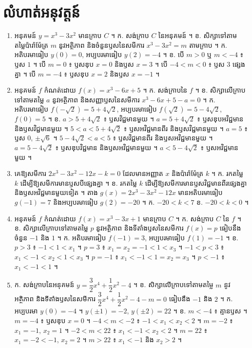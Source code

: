 \section*{លំហាត់អនុវត្តន៍}
\begin{enumerate}[1]
  \item អនុគមន៍ $y = x^3 - 3x^2$ មានក្រាប $C$ ។ \quad ក. សង់ក្រាប $C$ នៃអនុគមន៍ ។ \quad ខ. សិក្សាទៅតាមតម្លៃប៉ារ៉ាម៉ែត្រ $m$ នូវអត្ថិភាព និងចំនួនឫសនៃសមីការ $x^3 - 3x^2 = m$ តាមក្រាប ។
  \ans
  ក. អតិបរមាធៀប $y(0) = 0$, អប្បបរមាធៀប $y(2) = -4$ ។ ខ. បើ $m > 0$ ឬ $m < -4$ ៖ ឫស $1$ ។ បើ $m = 0$ ៖ ឫសឌុប $x = 0$ និងឫស $x = 3$ ។ បើ $-4 < m < 0$ ៖ ឫស $3$ ផ្សេងគ្នា ។ បើ $m = -4$ ៖ ឫសឌុប $x = 2$ និងឫស $x = -1$ ។
  \item អនុគមន៍ $f$ កំណត់ដោយ $f(x) = x^3 - 6x + 5$ ។ \quad ក. សង់ក្រាបនៃ $f$ ។ \quad ខ. សិក្សាលើក្រាបទៅតាមតម្លៃ $a$ នូវអត្ថិភាព និងសញ្ញាឫសនៃសមីការ $x^3 - 6x + 5 - a = 0$ ។
  \ans
  ក. អតិបរមាធៀប $f(-\sqrt{2}) = 5 + 4\sqrt{2}$, អប្បបរមាធៀប $f(\sqrt{2}) = 5 - 4\sqrt{2}$, $f(0) = 5$ ។ ខ. $a > 5 + 4\sqrt{2}$ ៖ ឫសវិជ្ជមានមួយ ។ $a = 5 + 4\sqrt{2}$ ៖ ឫសឌុបអវិជ្ជមាន និងឫសវិជ្ជមានមួយ ។ $5 < a < 5 + 4\sqrt{2}$ ៖ ឫសអវិជ្ជមានពីរ និងឫសវិជ្ជមានមួយ ។ $a = 5$ ៖ ឫស $0$, $\pm\sqrt{6}$ ។ $5 - 4\sqrt{2} < a < 5$ ៖ ឫសវិជ្ជមានពីរ និងឫសអវិជ្ជមានមួយ ។ $a = 5 - 4\sqrt{2}$ ៖ ឫសឌុបវិជ្ជមាន និងឫសអវិជ្ជមានមួយ ។ $a < 5 - 4\sqrt{2}$ ៖ ឫសអវិជ្ជមានមួយ ។
  \item គេឱ្យសមីការ $2x^3 - 3x^2 - 12x - k = 0$ ដែលមានអញ្ញាត $x$ និងប៉ារ៉ាម៉ែត្រ $k$ ។ \quad ក. រកតម្លៃ $k$ ដើម្បីឱ្យសមីការមានឫសបីផ្សេងគ្នា ។ \quad ខ. រកតម្លៃ $k$ ដើម្បីឱ្យសមីការមានឫសវិជ្ជមានពីរផ្សេងគ្នា និងឫសអវិជ្ជមានមួយទៀត ។
  \ans
  តាង $g(x) = 2x^3 - 3x^2 - 12x$ មានអតិបរមាធៀប $g(-1) = 7$ និងអប្បបរមាធៀប $g(2) = -20$ ។ ក. $-20 < k < 7$ \quad ខ. $-20 < k < 0$ ។
  \item អនុគមន៍ $f$ កំណត់ដោយ $f(x) = x^3 - 3x + 1$ មានក្រាប $C$ ។ \quad ក. សង់ក្រាប $C$ នៃ $f$ ។ \quad ខ. សិក្សាលើក្រាបទៅតាមតម្លៃ $p$ នូវអត្ថិភាព និងទីតាំងឫសនៃសមីការ $f(x) = p$ ធៀបនឹងចំនួន $-1$ និង $1$ ។
  \ans
  ក. អតិបរមាធៀប $f(-1) = 3$, អប្បបរមាធៀប $f(1) = -1$ ។ ខ. $p > 3$ ៖ $-1 < 1 < x_1$ ។ $p = 3$ ៖ $x_1 = x_2 = -1 < 1 < x_3$ ។ $-1 < p < 3$ ៖ $x_1 < -1 < x_2 < 1 < x_3$ ។ $p = -1$ ៖ $x_1 < -1 < 1 = x_2 = x_3$ ។ $p < -1$ ៖ $x_1 < -1 < 1$ ។
  \item ក. សង់ក្រាបនៃអនុគមន៍ $y = \dfrac{3}{2}x^4 + \dfrac{1}{2}x^2 - 4$ ។ \quad ខ. សិក្សាលើក្រាបទៅតាមតម្លៃ $m$ នូវអត្ថិភាព និងទីតាំងឫសនៃសមីការ $\dfrac{3}{2}x^4 + \dfrac{1}{2}x^2 - 4 - m = 0$ ធៀបនឹង $-1$ និង $2$ ។
  \ans
  ក. អប្បបរមា $y(0) = -4$ ។ $y(\pm 1) = -2$, $y(\pm 2) = 22$ ។ ខ. $m < -4$ ៖ គ្មានឫស ។ $m = -4$ ៖ ឫសឌុប $x = 0$ ។ $-4 < m < -2$ ៖ $-1 < x_1 < x_2 < 2$ ។ $m = -2$ ៖ $x_1 = -1$, $x_2 = 1$ ។ $-2 < m < 22$ ៖ $x_1 < -1 < x_2 < 2$ ។ $m = 22$ ៖ $x_1 = -2 < -1$, $x_2 = 2$ ។ $m > 22$ ៖ $x_1 < -1$ និង $x_2 > 2$ ។

\end{enumerate}
